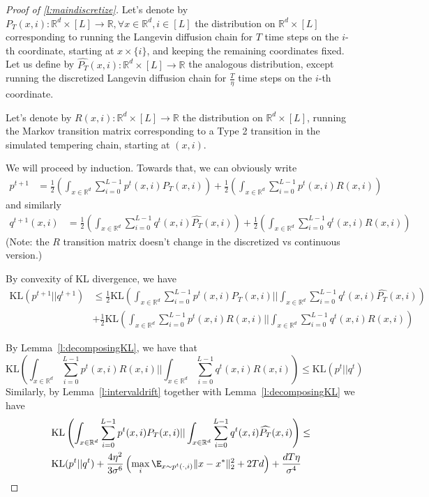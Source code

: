 \begin{proof}[Proof of \ref{l:maindiscretize}]
Let's denote by $P_T\left(x, i\right): \mathbb{R}^d \times [L]  \to \mathbb{R}, \forall x \in \mathbb{R}^d, i \in [L]$ the distribution on $\mathbb{R}^d \times [L]$ corresponding to running the Langevin diffusion chain for $T$ time steps on the $i$-th coordinate, starting at $x \times \{i\}$, and keeping the remaining coordinates fixed. Let us define 
 by $\widehat{P_T}\left(x, i\right): \mathbb{R}^d \times [L]  \to \mathbb{R}$ the analogous distribution, except running the discretized Langevin diffusion chain for $\frac{T}{\eta}$ time steps on the $i$-th coordinate.  

Let's denote by $R\left(x, i\right): \mathbb{R}^d \times [L]  \to \mathbb{R}$ the distribution on $\mathbb{R}^d \times [L]$, running the Markov transition matrix corresponding to a Type 2 transition in the simulated tempering chain, starting at $(x,i)$.   

We will proceed by induction. Towards that, we can obviously write   
\begin{align*} 
p^{t+1} &= \frac{1}{2} \left( \int_{x \in \mathbb{R}^d} \sum_{i=0}^{L-1} p^{t}(x,i) P_T(x, i) \right) + \frac{1}{2} \left( \int_{x \in \mathbb{R}^d} \sum_{i=0}^{L-1}  p^{t}(x,i) R(x, i) \right) 
\end{align*} 
and similarly
\begin{align*} 
q^{t+1}(x,i) &= \frac{1}{2} \left( \int_{x \in \mathbb{R}^d} \sum_{i=0}^{L-1} q^{t}(x,i) \widehat{P_T} (x, i) \right) + \frac{1}{2} \left( \int_{x \in \mathbb{R}^d} \sum_{i=0}^{L-1}  q^{t}(x,i) R(x, i) \right) 
\end{align*}
(Note: the $R$ transition matrix doesn't change in the discretized vs continuous version.) 

By convexity of KL divergence, we have
\begin{align*}
\mbox{KL}(p^{t+1} || q^{t+1}) &\leq \frac{1}{2} \mbox{KL}\left( \int_{x \in \mathbb{R}^d} \sum_{i=0}^{L-1} p^{t}(x,i) P_T(x, i) || \int_{x \in \mathbb{R}^d} \sum_{i=0}^{L-1} q^{t}(x,i) \widehat{P_T}(x, i) \right) \\ 
&+ \frac{1}{2} \mbox{KL}\left( \int_{x \in \mathbb{R}^d} \sum_{i=0}^{L-1}  p^{t}(x,i) R(x, i) || \int_{x \in \mathbb{R}^d} \sum_{i=0}^{L-1}  q^{t}(x,i) R(x, i)  \right)  
\end{align*} 

By Lemma~\ref{l:decomposingKL}, we have that 
$$\mbox{KL}\left( \int_{x \in \mathbb{R}^d} \sum_{i=0}^{L-1}  p^{t}(x,i) R(x, i) || \int_{x \in \mathbb{R}^d} \sum_{i=0}^{L-1}  q^{t}(x,i) R(x, i)  \right) \leq \mbox{KL} (p^t || q^t) $$ 
Similarly, by Lemma~\ref{l:intervaldrift} together with Lemma~\ref{l:decomposingKL} we have
\begin{align*} & \mbox{KL}\left( \int_{x \in \mathbb{R}^d} \sum_{i=0}^{L-1} p^{t}(x,i) P_T(x, i) || \int_{x \in \mathbb{R}^d} \sum_{i=0}^{L-1} q^{t}(x,i) \widehat{P_T}(x, i) \right)  \leq \\ & \mbox{KL} (p^t || q^t) + \frac{4 \eta^2}{3 \sigma^6} \left( \max_i \E_{x \sim p^t( \cdot, i)}\|x - x^*\|_2^2 + 2 Td\right) + \frac{d T \eta}{\sigma^4} \end{align*}


\end{proof}
